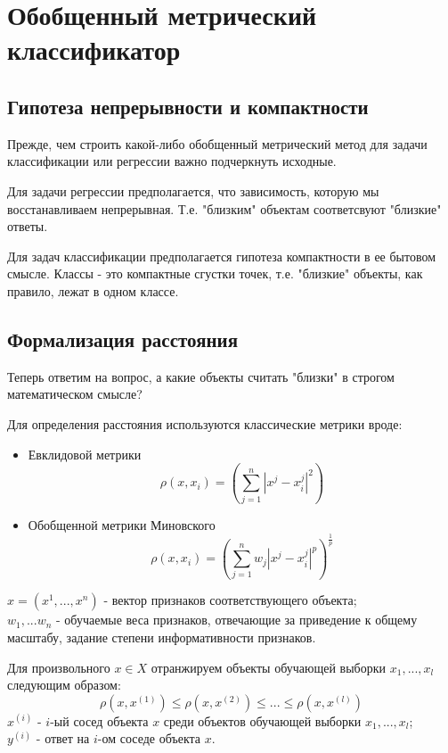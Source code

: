 \section{Обобщенный метрический классификатор}

\subsection{Гипотеза непрерывности и компактности}

Прежде, чем строить какой-либо обобщенный метрический метод для задачи классификации или регрессии важно подчеркнуть исходные.

Для задачи регрессии предполагается, что зависимость, которую мы восстанавливаем непрерывная. Т.е. "близким" объектам соответсвуют "близкие" ответы.

Для задач классификации предполагается гипотеза компактности в ее бытовом смысле. Классы - это компактные сгустки точек, т.е. "близкие" объекты, как правило, лежат в одном классе.

\subsection{Формализация расстояния}

Теперь ответим на вопрос, а какие объекты считать "близки" в строгом математическом смысле?

Для определения расстояния используются классические метрики вроде:
\begin{itemize}
    \item Евклидовой метрики
        \begin{equation}
            \rho(x, x_i) = \left( \sum_{j=1}^n |x^j - x^j_i|^2 \right)
        \end{equation}
    \item Обобщенной метрики Миновского
        \begin{equation}
            \rho(x, x_i) = \left( \sum_{j=1}^n w_j |x^j - x^j_i|^p \right)^\frac{1}{p}
        \end{equation}
\end{itemize}
$x = (x^1, ... , x^n)$ - вектор признаков соответствующего объекта; \\ 
$w_1, ... w_n$ - обучаемые веса признаков, отвечающие за приведение к общему масштабу, задание степени информативности признаков.

Для произвольного $x \in X$ отранжируем объекты обучающей выборки $x_1, ..., x_l$ следующим образом:
\begin{equation}
    \rho(x, x^{(1)}) \le \rho(x, x^{(2)}) \le ... \le \rho(x, x^{(l)})
\end{equation}
$x^{(i)}$ - $i$-ый сосед объекта $x$ среди объектов обучающей выборки $x_1, ..., x_l$; \\ 
$y^{(i)}$ - ответ на $i$-ом соседе объекта $x$.

